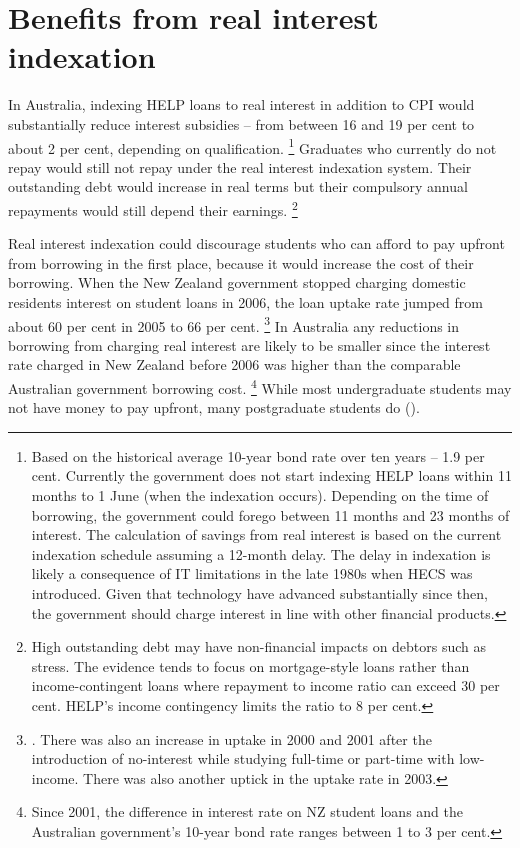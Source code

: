 \documentclass[embargoed]{grattan}
\begin{document}
\section{Benefits from real interest indexation}\label{benefits-from-real-interest-indexation}

In Australia, indexing \gls{HELP} loans to real interest in addition to \gls{CPI} would substantially reduce interest subsidies -- from between 16 and 19 per cent to about 2 per cent, depending on qualification.
\footnote{Based on the historical average 10-year bond rate over ten years -- 1.9 per cent.\label{fn:68-High-outstanding-debt-non-fin-impact}
Currently the government does not start indexing \gls{HELP} loans within 11 months to 1 June (when the indexation occurs).
Depending on the time of borrowing, the government could forego between 11 months and 23 months of interest.
The calculation of savings from real interest is based on the current indexation schedule assuming a 12-month delay.
The delay in indexation is likely a consequence of IT limitations in the late 1980s when \gls{HECS} was introduced.
Given that technology have advanced substantially since then, the government should charge interest in line with other financial products.} Graduates who currently do not repay would still not repay under the real interest indexation system.
Their outstanding debt would increase in real terms but their compulsory annual repayments would still depend their earnings.%
\footnote{High outstanding debt may have non-financial impacts on debtors such as stress.
The evidence tends to focus on mortgage-style loans rather than income-contingent loans where repayment to income ratio can exceed 30 per cent.
\gls{HELP}'s income contingency limits the ratio to 8 per cent.}

Real interest indexation could discourage students who can afford to pay upfront from borrowing in the first place, because it would increase the cost of their borrowing.
When the New Zealand government stopped charging domestic residents interest on student loans in 2006, the loan uptake rate jumped from about 60 per cent in 2005 to 66 per cent.%
\footnote{\textcite[][23]{EducationNZ2013Studentloanscheme}. 
There was also an increase in uptake in 2000 and 2001 after the introduction of no-interest while studying full-time or part-time with low-income.
There was also another uptick in the uptake rate in 2003.} 
In Australia any reductions in borrowing from charging real interest are likely to be smaller since the interest rate charged in New Zealand before 2006 was higher than the comparable Australian government borrowing cost.%
\footnote{Since 2001, the difference in interest rate on NZ student loans and the Australian government's 10-year bond rate ranges between 1 to 3 per cent.} While most undergraduate students may not have money to pay upfront, many postgraduate students do ().
\end{document}
